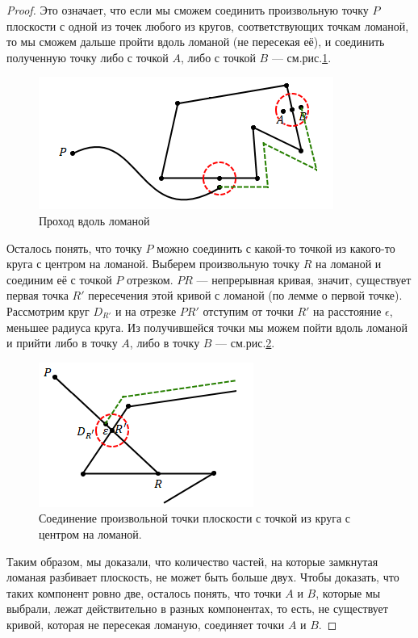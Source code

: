 \begin{proof}
    Это означает, что если мы сможем соединить произвольную точку $P$ плоскости с одной из точек любого из кругов, соответствующих точкам ломаной, то мы сможем дальше пройти вдоль ломаной (не пересекая её), и соединить полученную точку либо с точкой $A$, либо с точкой $B$ — см.рис.\ref{fig:c4.3}.

    \begin{figure}[h]
        \centering
        \includegraphics{images/c4.3.png}
        \caption{Проход вдоль ломаной}
        \label{fig:c4.3}
    \end{figure}

    Осталось понять, что точку $P$ можно соединить с какой-то точкой из какого-то круга с центром на ломаной.
    Выберем произвольную точку $R$ на ломаной и соединим её с точкой $P$ отрезком. $PR$ — непрерывная кривая, значит, существует первая точка $R'$ пересечения этой кривой с ломаной (по лемме о первой точке). Рассмотрим круг $D_{R'}$ и на отрезке $PR'$ отступим от точки $R'$ на расстояние $\epsilon$, меньшее радиуса круга. Из получившейся точки мы можем пойти вдоль ломаной и прийти либо в точку $A$, либо в точку $B$ — см.рис.\ref{fig:c4.4}.

    \begin{figure}[h]
        \centering
        \includegraphics{images/c4.4.png}
        \caption{Соединение произвольной точки плоскости с точкой из круга с центром на ломаной.}
        \label{fig:c4.4}
    \end{figure}

    Таким образом, мы доказали, что количество частей, на которые замкнутая ломаная разбивает плоскость, не может быть больше двух. Чтобы доказать, что таких компонент ровно две, осталось понять, что точки $A$ и $B$, которые мы выбрали, лежат действительно в разных компонентах, то есть, не существует кривой, которая не пересекая ломаную, соединяет точки $A$ и $B$.


\end{proof}
